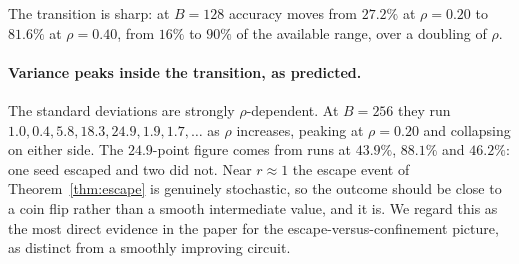 \documentclass{article}
\theoremstyle{plain}
\theoremstyle{definition}
\theoremstyle{remark}
\newcommand{\1}{\mathbf{1}}
\begin{document}
The transition is sharp: at $B = 128$ accuracy moves from $27.2\%$ at
$\rho = 0.20$ to $81.6\%$ at $\rho = 0.40$, from $16\%$ to $90\%$ of the
available range, over a doubling of $\rho$.

\paragraph{Variance peaks inside the transition, as predicted.}
The standard deviations are strongly $\rho$-dependent. At $B = 256$ they run
$1.0, 0.4, 5.8, 18.3, 24.9, 1.9, 1.7,\dots$ as $\rho$ increases, peaking at
$\rho = 0.20$ and collapsing on either side. The $24.9$-point figure comes from
runs at $43.9\%$, $88.1\%$ and $46.2\%$: one seed escaped and two did not. Near
$r\approx1$ the escape event of Theorem~\ref{thm:escape} is genuinely stochastic,
so the outcome should be close to a coin flip rather than a smooth intermediate
value, and it is. We regard this as the most direct evidence in the paper for the
escape-versus-confinement picture, as distinct from a smoothly improving circuit.
\end{document}
